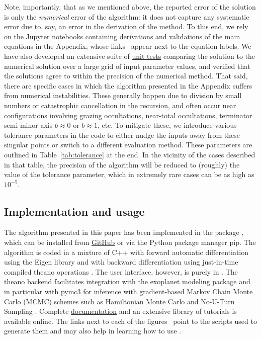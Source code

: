 \documentclass[modern]{aastex62}
\begin{document}
Note, importantly, that as we mentioned above, the reported error of the \starry
solution is only the \emph{numerical} error of the algorithm: it does not
capture any systematic error due to, say, an error in the derivation of
the method. To this end, we rely on the Jupyter notebooks containing
derivations and validations of the main equations in the Appendix, whose
links \prooficon\, appear next to the equation labels.
%
We have also developed an extensive suite of
\href{https://github.com/rodluger/starry/tree/master/tests}{unit tests}
comparing the \starry solution to the numerical solution over a large
grid of input parameter values, and verified that the solutions agree
to within the precision of the numerical method.
%
That said, there are specific cases in which the algorithm presented in the
Appendix suffers from numerical instabilities. These generally happen due
to division by small numbers or catastrophic cancellation in the recursion,
and often occur near configurations involving grazing occultations,
near-total occultations, terminator semi-minor axis $b \approx 0$ or
$b \approx 1$, etc. To mitigate these, we introduce various tolerance
parameters in the code to either nudge the inputs away from these singular
points or switch to a different evaluation method. These parameters are
outlined in Table~\ref{tab:tolerance} at the end. In the vicinity of the cases
described in that table, the precision of the \starry algorithm will be
reduced to (roughly) the value of the tolerance parameter, which in
extremely rare cases can be as high as $10^{-5}$.

\subsection{Implementation and usage}
\label{sec:usage}

The algorithm presented in this paper has been implemented in the \Python
package \starry, which can be installed from
\href{https://github.com/rodluger/starry}{GitHub} or via the Python package
manager \textsf{pip}. The algorithm is coded in a mixture of \textsf{C++}
with forward automatic differentiation using the \textsf{Eigen} library
\citep{eigen} and \Python with backward differentiation using
just-in-time compiled \textsf{theano}
operations \citep{theano}. The user interface, however, is purely in
\Python. The \textsf{theano} backend facilitates integration with the
\textsf{exoplanet} modeling package \citep{exoplanet} and in particular
with \textsf{pymc3} \citep{pymc3} for inference with gradient-based
Markov Chain Monte Carlo (MCMC) schemes
such as Hamiltonian Monte Carlo \citep[HMC;][]{Duane1987}
and No-U-Turn Sampling \citep[NUTS;][]{Hoffman2011}.
%
Complete \href{https://rodluger.github.io/starry}{documentation} and an
extensive library of tutorials is available online.
The links next to each
of the figures \codeicon\, point to the \Python scripts used to generate
them and may also help in learning how to use \starry.
\end{document}
